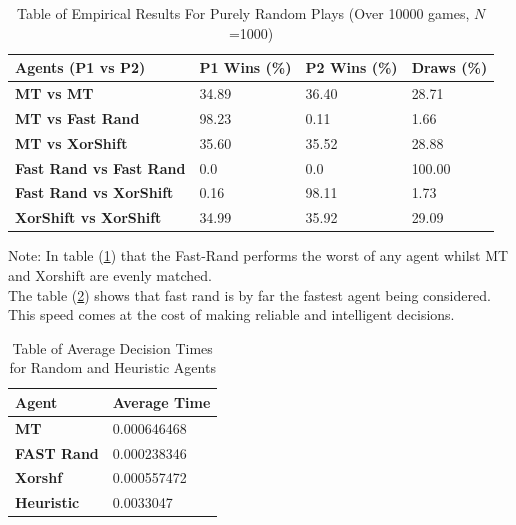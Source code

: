 \documentclass[journal]{IEEEtran}
\begin{document}
\begin{table}[H]
\centering
\caption{Table of Empirical Results For Purely Random Plays (Over 10000 games, $N$=1000)}
\label{results-table-rnd}
\begin{tabular}{|l|l|l|l|}
\hline
\textbf{Agents (P1 vs P2)}      & \textbf{P1 Wins (\%)} & \textbf{P2 Wins (\%)} & \textbf{Draws (\%)} \\ \hline
\textbf{MT vs MT}               & 34.89                       & 36.40                       & 28.71               \\ \hline
\textbf{MT vs Fast Rand}        & 98.23                       & 0.11                        & 1.66                \\ \hline
\textbf{MT vs XorShift}         & 35.60                       & 35.52                       & 28.88               \\ \hline
\textbf{Fast Rand vs Fast Rand} & 0.0                         & 0.0                         & 100.00              \\ \hline
\textbf{Fast Rand vs XorShift}  & 0.16                        & 98.11                       & 1.73                \\ \hline
\textbf{XorShift vs XorShift}   & 34.99                       & 35.92                       & 29.09               \\ \hline
\end{tabular}
\end{table}
\noindent Note: In table (\ref{results-table-rnd}) that the Fast-Rand performs the worst of any agent whilst MT and Xorshift are evenly matched.
\\

The table (\ref{results-table-rnd-avg-time}) shows that fast rand is by far the fastest agent being considered. This speed comes at the cost of making reliable and intelligent decisions. 

\begin{table}[H]
  \centering
  \caption{Table of Average Decision Times for Random and Heuristic Agents}
  \label{results-table-rnd-avg-time}
  \def\arraystretch{1.5}%
  \begin{tabular}{|l|l|}
  \hline
  \textbf{Agent}     & \textbf{Average Time} \\ \hline
  \textbf{MT}        & 0.000646468           \\ \hline
  \textbf{FAST Rand}      & 0.000238346           \\ \hline
  \textbf{Xorshf}    & 0.000557472           \\ \hline
  \textbf{Heuristic} & 0.0033047             \\ \hline
  \end{tabular}
\end{table}
\end{document}
